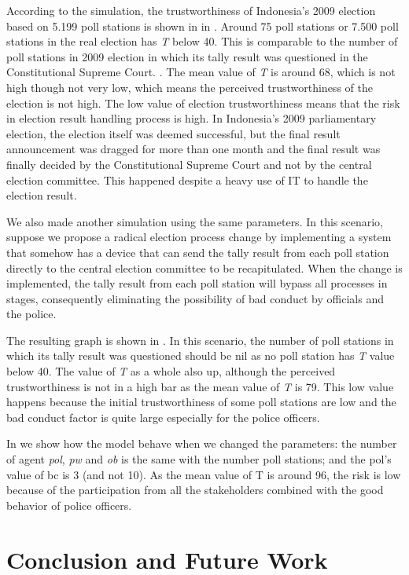 \documentclass[JIP]{ipsj}
\begin{document}
According to the simulation, the trustworthiness of Indonesia's 2009 election based on 5.199 poll stations is shown in in . Around 75 poll stations or 7.500 poll stations in the real election has \textit{T} below 40. This is comparable to the number of poll stations in 2009 election in which its tally result was questioned in the Constitutional Supreme Court. \cite{kemitraan201109}. The mean value of \textit{T} is around 68, which is not high though not very low, which means the perceived trustworthiness of the election is not high. The low value of election trustworthiness means that the risk in election result handling process is high. In Indonesia's 2009 parliamentary election, the election itself was deemed successful, but the final result announcement was dragged for more than one month and the final result was finally decided by the Constitutional Supreme Court and not by the central election committee. This happened despite a heavy use of IT to handle the election result.

We also made another simulation using the same parameters. In this scenario, suppose we propose a radical election process change by implementing a system that somehow has a device that can send the tally result from each poll station directly to the central election committee to be recapitulated. When the change is implemented, the tally result from each poll station will bypass all processes in stages, consequently eliminating the possibility of bad conduct by officials and the police.

The resulting graph is shown in . In this scenario, the number of poll stations in which its tally result was questioned should be nil as no poll station has \textit{T} value below 40. The value of \textit{T} as a whole also up, although the perceived trustworthiness is not in a high bar as the mean value of \textit{T} is 79. This low value happens because the initial trustworthiness of some poll stations are low and the bad conduct factor is quite large especially for the police officers.

In  we show how the model behave when we changed the parameters: the number of agent \textit{pol}, \textit{pw} and \textit{ob} is the same with the number poll stations; and the pol's value of bc is 3 (and not 10). As the mean value of T is around 96, the risk is low because of the participation from all the stakeholders combined with the good behavior of police officers.


\section{Conclusion and Future Work}
\end{document}
